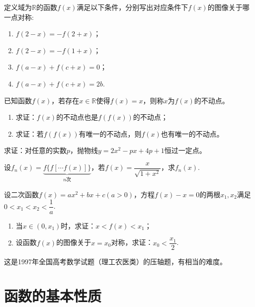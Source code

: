 \documentclass[lang=cn,math=cm,chinesefont=nofont,11pt,scheme=chinese,onecol]{elegantbook}
\begin{document}
\begin{exercise}
  定义域为$\mathbb{R}$的函数$f(x)$满足以下条件，分别写出对应条件下$f(x)$的图像关于哪一点对称:
\end{exercise}

\begin{enumerate}
  \item $f(2-x)=-f(2+x)$；
  \item $f(2-x)=-f(1+x)$；
  \item $f(a-x)+f(c+x)=0$；
  \item $f(a-x)+f(c+x)=2b$.
\end{enumerate}

\begin{exercise}
  已知函数$f(x)$，若存在$x\in\mathbb{R}$使得$f(x)=x$，则称$x$为$f(x)$的不动点。
\end{exercise}

\begin{enumerate}
  \item 求证：$f(x)$的不动点也是$f(f(x))$的不动点；
  \item 求证：若$f(f(x))$有唯一的不动点，则$f(x)$也有唯一的不动点。
\end{enumerate}

\begin{exercise}\label{ASJC_G1_P22.5}
  求证：对任意的实数$p$，抛物线$y=2x^2-px+4p+1$恒过一定点。
\end{exercise}

\begin{exercise}
  设$f_n(x)=\underbrace{f\{f[\cdots f(x)]\}}_{n\text{次}}$，若$f(x)=\dfrac{x}{\sqrt{1+x^2}}$，求$f_n(x)$.
\end{exercise}

\begin{exercise}
  设二次函数$f(x)=ax^{2}+bx+c(a>0)$，方程$f(x)-x=0$的两根$x_1,x_2$满足$0<x_1<x_2<\dfrac1a$.
\end{exercise}

\begin{enumerate}
  \item 当$x\in(0,x_1)$时，求证：$x<f(x)<x_1$；
  \item 设函数$f(x)$的图像关于$x=x_0$对称，求证：$x_0<\dfrac{x_1}{2}$.
\end{enumerate}

\begin{remark}
  这是1997年全国高考数学试题（理工农医类）的压轴题，有相当的难度。
\end{remark}

\section{函数的基本性质}
\end{document}
